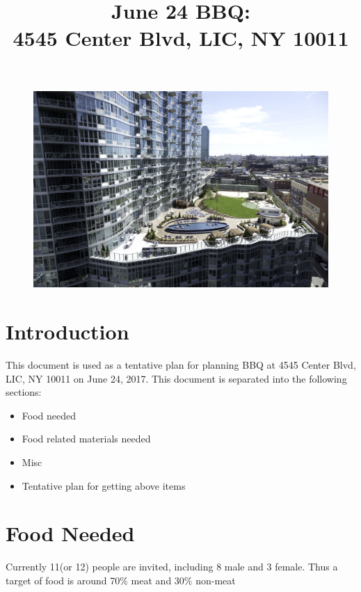 \documentclass[12pt]{article}
\begin{document}
		

	
	
	
	\begin{center}
		\title*{\Huge June 24 BBQ:\\ 4545 Center Blvd, LIC, NY 10011}
	\end{center}
		
		\begin{figure}[H]
			\includegraphics[width=\linewidth]{1}
		\end{figure}	
	\date{}

	
	
\section*{Introduction}
	This document is used as a tentative plan for planning BBQ at 4545 Center Blvd, LIC, NY 10011 on June 24, 2017. This document is separated into the following sections:
	\begin{itemize}
		\item Food needed		
		\item Food related materials needed
		\item Misc
		\item Tentative plan for getting above items
	\end{itemize}
	


\section*{Food Needed}
	Currently 11(or 12) people are invited, including 8 male and 3 female. Thus a target of food is around 70\% meat and 30\% non-meat
	
\end{document}
